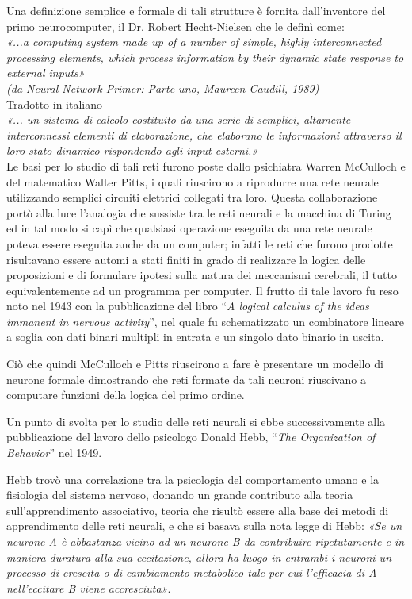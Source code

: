 \documentclass[12pt,a4paper,oneside]{book}
\begin{document}
		Una definizione semplice e formale di tali strutture è fornita dall'inventore del primo neurocomputer, il Dr. Robert Hecht-Nielsen che le definì come: \\
		
		\textit{«...a computing system made up of a number of simple, highly interconnected processing elements, which process information by their dynamic state response to external inputs»}\\
		\textit{(da Neural Network Primer: Parte uno, Maureen Caudill, 1989)}\\
		
		Tradotto in italiano \\
		\textit{«... un sistema di calcolo costituito da una serie di semplici, altamente interconnessi elementi di elaborazione, che elaborano le informazioni attraverso il loro stato dinamico rispondendo agli input esterni.»}\\
		
	    Le basi per lo studio di tali reti furono poste dallo psichiatra Warren McCulloch e del matematico Walter Pitts, i quali riuscirono a riprodurre una rete neurale utilizzando semplici circuiti elettrici collegati tra loro. Questa collaborazione portò alla luce l'analogia che sussiste tra le reti neurali e la macchina di Turing ed in tal modo si capì che qualsiasi operazione eseguita da una rete neurale poteva essere eseguita anche da un computer; infatti le reti che furono prodotte risultavano essere automi a stati finiti in grado di realizzare la logica delle proposizioni e di formulare ipotesi sulla natura dei meccanismi cerebrali, il tutto equivalentemente ad un programma per computer.
	    Il frutto di tale lavoro fu reso noto nel 1943 con la pubblicazione del libro ``\emph{A logical calculus of the ideas immanent in nervous activity}'', nel quale fu schematizzato un combinatore lineare a soglia con dati binari multipli in entrata e un singolo dato binario in uscita.
	    
	    Ciò che quindi McCulloch e Pitts riuscirono a fare è presentare un modello di neurone formale dimostrando che reti formate da tali neuroni riuscivano a computare funzioni della logica del primo ordine.
	    
	    Un punto di svolta per lo studio delle reti neurali si ebbe successivamente alla pubblicazione del lavoro dello psicologo Donald Hebb, ``\emph{The Organization of Behavior}'' nel 1949.
	     
	    Hebb trovò una correlazione tra la psicologia del comportamento umano e la fisiologia del sistema nervoso, donando un grande contributo alla teoria sull'apprendimento associativo, teoria che risultò essere alla base dei metodi di apprendimento delle reti neurali, e che si basava sulla nota legge di Hebb: \textit{«Se un neurone A è abbastanza vicino ad un neurone B da contribuire ripetutamente e in maniera duratura alla sua eccitazione, allora ha luogo in entrambi i neuroni un processo di crescita o di cambiamento metabolico tale per cui l'efficacia di A nell'eccitare B viene accresciuta»}.
	    
\end{document}
